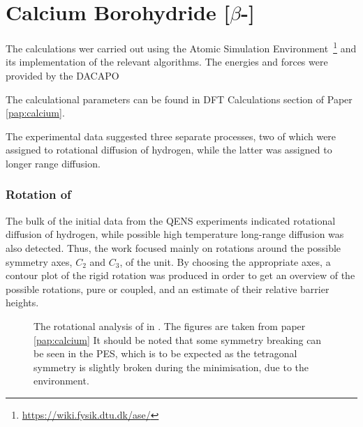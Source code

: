\section{Calcium Borohydride [$\beta$-]}
\label{sec:borohydrides-calcium}

The calculations wer carried out using the Atomic Simulation Environment~\cite{ase-2002}\footnote{\url{https://wiki.fysik.dtu.dk/ase/}} and its implementation of the relevant algorithms.
The energies and forces were provided by the DACAPO

The calculational parameters can be found in DFT Calculations section of Paper \ref{pap:calcium}.

The experimental data suggested three separate processes, two of which were assigned to rotational diffusion of hydrogen, while the latter was assigned to longer range diffusion.

\subsubsection{Rotation of }
The bulk of the initial data from the QENS experiments indicated rotational diffusion of hydrogen, while possible high temperature long-range diffusion was also detected.
Thus, the work focused mainly on rotations around the possible symmetry axes, $C_2$ and $C_3$, of the  unit.
By choosing the appropriate axes, a contour plot of the rigid rotation was produced in order to get an overview of the possible rotations, pure or coupled, and an estimate of their relative barrier heights.

\begin{figure}[h]
\begin{center}
    \parbox{0.85\linewidth}{
      \caption{The rotational analysis of  in .
      The figures are taken from paper \ref{pap:calcium}
It should be noted that some symmetry breaking can be seen in the PES, which is to be expected as the tetragonal symmetry is slightly broken during the minimisation, due to the environment.
      }
      \label{fig:ca-rotational}
    }
\end{center}
\end{figure}

